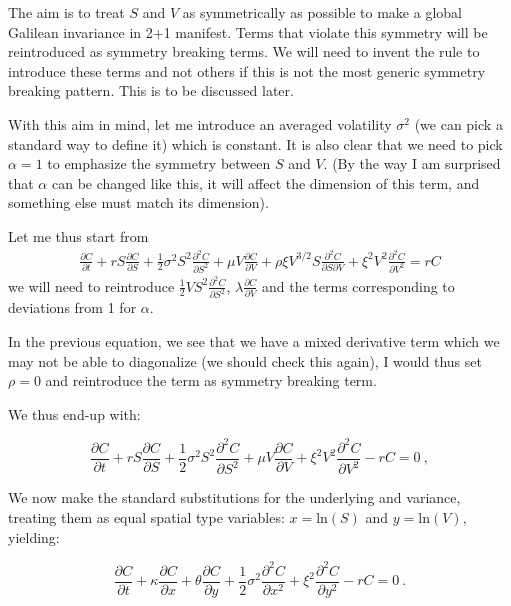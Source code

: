 \documentclass[english,12pt]{article}
\begin{document}
The aim is to treat $S$ and $V$ as symmetrically as possible to make a global Galilean invariance in 2+1 manifest. Terms that violate this symmetry will be reintroduced as symmetry breaking terms. We will need to invent the rule to introduce these terms and not others if this is not the most generic symmetry breaking pattern. This is to be discussed later.

With this aim in mind, let me introduce an averaged volatility $\sigma^{2}$ (we can pick a standard way to define it) which is constant.  It is also clear that we need to pick $\alpha=1$  to emphasize the symmetry between $S$ and $V$. (By the way I am surprised that $\alpha$ can be changed like this, it will affect the dimension of this term, and something else must match its dimension).

Let me thus start from 
\begin{eqnarray}
\label{full merton} \frac{\partial C}{\partial t}+ r S \frac{\partial C}{\partial S} + \frac{1}{2} \sigma^{2} S^2 \frac{\partial^2 C}{\partial S^2} +\mu V \frac{\partial C}{\partial V} +\rho \xi V^{3/2} S \frac{\partial^2 C}{\partial S \partial V} +\xi^2 V^{2}  \frac{\partial^2 C}{\partial V^2}= r C
\end{eqnarray}
we will need to reintroduce $\frac{1}{2} V S^2 \frac{\partial^2 C}{\partial S^2}$,  $\lambda \frac{\partial C}{\partial V} $ and the terms corresponding to deviations from 1 for $\alpha$.

In the previous equation, we see that we have a mixed derivative term which we may not be able to diagonalize (we should check this again), I would thus set $\rho=0$ and reintroduce the term as symmetry breaking term. 

We thus end-up with:

\begin{equation}
\frac{\partial C}{\partial t} + rS\frac{\partial C}{\partial S} + \frac{1}{2}{\sigma^{2}}S^{2}\frac{\partial^2 C}{\partial S^2} + \mu V \frac{\partial C}{\partial V} + \xi^2 V^2 \frac{\partial^2 C}{\partial V^2} - rC = 0~,
\end{equation}


We now make the standard substitutions for the underlying and variance, treating them as equal spatial type variables: $x = \text{ln}(S)$ and $y = \text{ln}(V)$, yielding:

\begin{equation}
\frac{\partial C}{\partial t} + \kappa \frac{\partial C}{\partial x} + \theta \frac{\partial C}{\partial y} + \frac{1}{2}{\sigma^{2}}\frac{\partial^2 C}{\partial x^2} + \xi^2 \frac{\partial^2 C}{\partial y^2} - rC = 0~.
\end{equation}
\end{document}
